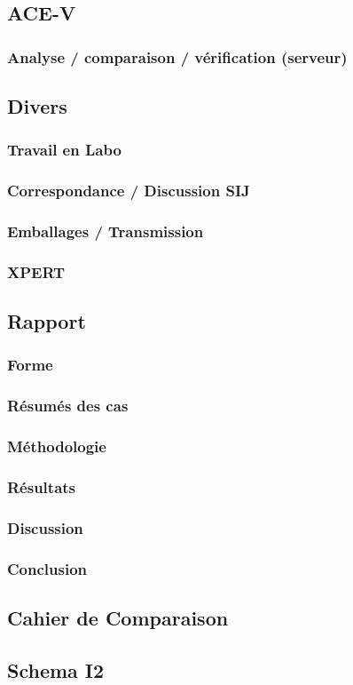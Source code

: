 \documentclass{esc/esc_tp}
\begin{document}
\subsection{ACE-V}
\subsubsection{Analyse / comparaison / vérification (serveur)}
\lipsum[10]

\subsection{Divers}
\subsubsection{Travail en Labo}
\lipsum[11]
\subsubsection{Correspondance / Discussion SIJ}
\lipsum[12]
\subsubsection{Emballages / Transmission}
\lipsum[13]
\subsubsection{XPERT}
\lipsum[14]

\subsection{Rapport}
\subsubsection{Forme}
\lipsum[1]
\subsubsection{Résumés des cas}
\lipsum[2]
\subsubsection{Méthodologie}
\lipsum[4]
\subsubsection{Résultats}
\lipsum[5]
\subsubsection{Discussion}
\lipsum[6]
\subsubsection{Conclusion}
\lipsum[7]

\subsection{Cahier de Comparaison}
\lipsum[9]

\subsection{Schema I2}
\lipsum[10]
\end{document}
